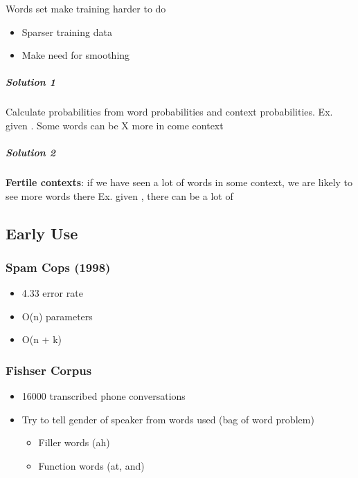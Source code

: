       Words set make training harder to do
      \begin{itemize}
        \item Sparser training data
        \item Make need for smoothing
      \end{itemize}

      \subparagraph{Solution 1}
      Calculate probabilities from word probabilities and context probabilities.
      Ex. given . Some words can be X more in come context

      \subparagraph{Solution 2}
      \textbf{Fertile contexts}: if we have seen a lot of words in some context,
      we are likely to see more words there
      Ex. given , there can be a lot of 

  \subsection{Early Use}

    \subsubsection{Spam Cops (1998)}

      \begin{itemize}
        \item 4.33 error rate
        \item O(n) parameters
        \item O(n + k)
      \end{itemize}

    \subsubsection{Fishser Corpus}

      \begin{itemize}
        \item 16000 transcribed phone conversations
        \item Try to tell gender of speaker from words used (bag of word problem)
        \begin{itemize}
          \item Filler words (ah)
          \item Function words (at, and)
        \end{itemize}
      \end{itemize}
